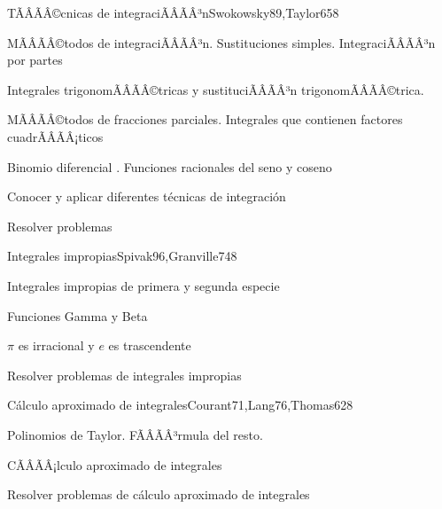 \begin{sumilla}
\begin{unit}{TÃÂÃÂ©cnicas de integraciÃÂÃÂ³n}{Swokowsky89,Taylor65}{8}
\begin{topicos}
	\item MÃÂÃÂ©todos de integraciÃÂÃÂ³n. Sustituciones simples. IntegraciÃÂÃÂ³n por partes
	\item Integrales trigonomÃÂÃÂ©tricas y sustituciÃÂÃÂ³n trigonomÃÂÃÂ©trica.
	\item MÃÂÃÂ©todos de fracciones parciales. Integrales que contienen factores  cuadrÃÂÃÂ¡ticos
	\item Binomio diferencial . Funciones racionales del seno y coseno
\end{topicos}

\begin{objetivos}
	\item Conocer y aplicar diferentes t\'ecnicas de integraci\'on
	\item Resolver problemas
\end{objetivos}
\end{unit}

\begin{unit}{Integrales impropias}{Spivak96,Granville74}{8}
\begin{topicos}
	\item Integrales impropias de primera y segunda especie
	\item Funciones Gamma y Beta
	\item $\pi$ es irracional y $e$ es trascendente
\end{topicos}

\begin{objetivos}
	\item Resolver problemas de integrales impropias
\end{objetivos}
\end{unit}

\begin{unit}{C\'alculo aproximado de integrales}{Courant71,Lang76,Thomas62}{8}
\begin{topicos}
      \item Polinomios de Taylor. FÃÂÃÂ³rmula del resto.
      \item CÃÂÃÂ¡lculo aproximado de integrales
  \end{topicos}

   \begin{objetivos}
      \item Resolver problemas de c\'alculo aproximado de integrales
   \end{objetivos}
\end{unit}

\begin{bibliografia}
\end{bibliografia}
\end{sumilla}
